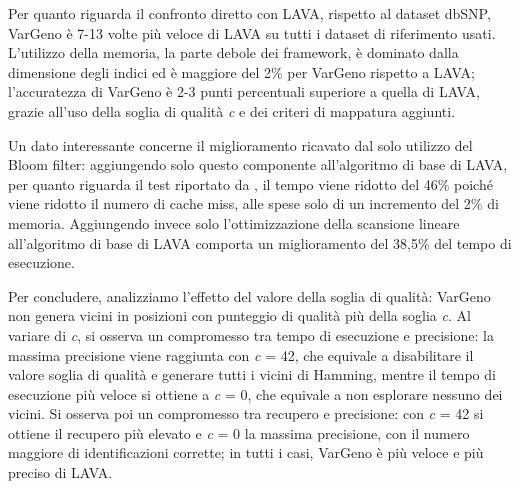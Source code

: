 \documentclass[../main.tex]{subfiles}
\begin{document}
Per quanto riguarda il confronto diretto con LAVA, rispetto al dataset dbSNP, VarGeno è 7-13 volte più veloce di LAVA su tutti i dataset di riferimento usati. L'utilizzo della memoria, la parte debole dei framework, è dominato dalla dimensione degli indici ed è maggiore del 2\% per VarGeno rispetto a LAVA; l'accuratezza di VarGeno è 2-3 punti percentuali superiore a quella di LAVA, grazie all'uso della soglia di qualità \textit{c} e dei criteri di mappatura aggiunti. 

Un dato interessante concerne il miglioramento ricavato dal solo utilizzo del Bloom filter: aggiungendo solo questo componente all'algoritmo di base di LAVA, per quanto riguarda il test riportato da \cite{sun-medvedev2018vargeno}, il tempo viene ridotto del 46\% poiché viene ridotto il numero di cache miss, alle spese solo di un incremento del 2\% di memoria. Aggiungendo invece solo l'ottimizzazione della scansione lineare all'algoritmo di base di LAVA comporta un miglioramento del 38,5\% del tempo di esecuzione. 

Per concludere, analizziamo l'effetto del valore della soglia di qualità: VarGeno non genera vicini in posizioni con punteggio di qualità più della soglia \textit{c}. Al variare di \textit{c}, si osserva un compromesso tra tempo di esecuzione e precisione: la massima precisione viene raggiunta con \textit{c} = 42, che equivale a disabilitare il valore soglia di qualità e generare tutti i vicini di Hamming, mentre il tempo di esecuzione più veloce si ottiene a \textit{c} = 0, che equivale a non esplorare nessuno dei vicini. Si osserva poi un compromesso tra recupero e precisione: con \textit{c} = 42 si ottiene il recupero più elevato e \textit{c} = 0 la massima precisione, con il numero maggiore di identificazioni corrette; in tutti i casi, VarGeno è più veloce e più preciso di LAVA. 
\end{document}
